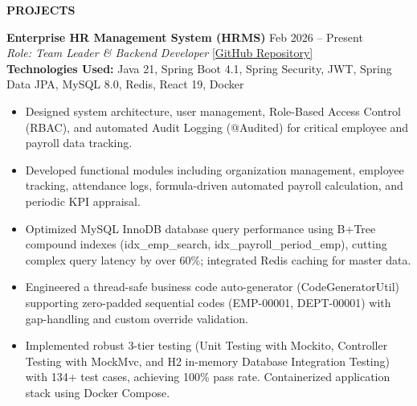 ﻿\documentclass[11pt,a4paper]{article}
\newcommand{\cvsection}[1]{%
  \vspace{7pt}%
  \noindent\textbf{\large #1}\par%
  \vspace{3pt}%
}
\begin{document}
\newpage %

\cvsection{PROJECTS}

\noindent
\textbf{Enterprise HR Management System (HRMS)} \hfill Feb 2026 -- Present \\
\textit{Role: Team Leader \& Backend Developer} \hfill \href{https://github.com/ng-doanh/hr-management-system}{[GitHub Repository]} \\
\textbf{Technologies Used:} Java 21, Spring Boot 4.1, Spring Security, JWT, Spring Data JPA, MySQL 8.0, Redis, React 19, Docker
\begin{itemize}[leftmargin=1.5em, itemsep=2pt, topsep=2pt]
    \item Designed system architecture, user management, Role-Based Access Control (RBAC), and automated Audit Logging (@Audited) for critical employee and payroll data tracking.
    \item Developed functional modules including organization management, employee tracking, attendance logs, formula-driven automated payroll calculation, and periodic KPI appraisal.
    \item Optimized MySQL InnoDB database query performance using B+Tree compound indexes (idx\_emp\_search, idx\_payroll\_period\_emp), cutting complex query latency by over 60\%; integrated Redis caching for master data.
    \item Engineered a thread-safe business code auto-generator (CodeGeneratorUtil) supporting zero-padded sequential codes (EMP-00001, DEPT-00001) with gap-handling and custom override validation.
    \item Implemented robust 3-tier testing (Unit Testing with Mockito, Controller Testing with MockMvc, and H2 in-memory Database Integration Testing) with 134+ test cases, achieving 100\% pass rate. Containerized application stack using Docker Compose.
\end{itemize}

\vspace{6pt}
\end{document}
